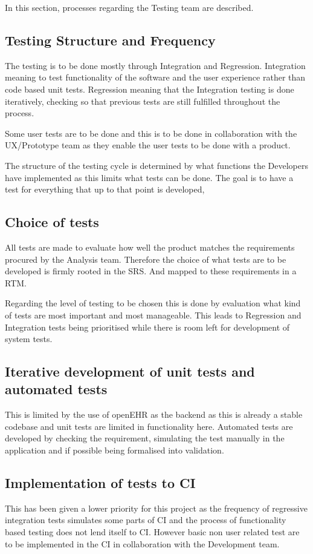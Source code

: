 In this section, processes regarding the Testing team are described.

\subsection{Testing Structure and Frequency}
The testing is to be done mostly through Integration and Regression. Integration meaning to test functionality of the software and the user experience rather than code based unit tests.
Regression meaning that the Integration testing is done iteratively, checking so that previous tests are still fulfilled throughout the process.

Some user tests are to be done and this is to be done in collaboration with the UX/Prototype team as they enable the user tests to be done with a product.

The structure of the testing cycle is determined by what functions the Developers have implemented as this limits what tests can be done. The goal is to have a test for everything that up to that point is developed,

\subsection{Choice of tests}
All tests are made to evaluate how well the product matches the requirements procured by the Analysis team. Therefore the choice of what tests are to be developed is firmly rooted in the SRS. And mapped to these requirements in a RTM.

Regarding the level of testing to be chosen this is done by evaluation what kind of tests are most important and most manageable. This leads to Regression and Integration tests being prioritised while there is room left for development of system tests.

\subsection{Iterative development of unit tests and automated tests}
This is limited by the use of openEHR as the backend as this is already a stable codebase and unit tests are limited in functionality here. Automated tests are developed by checking the requirement, simulating the test manually in the application and if possible being formalised into validation.

\subsection{Implementation of tests to CI}
This has been given a lower priority for this project as the frequency of regressive integration tests simulates some parts of CI and the process of functionality based testing does not lend itself to CI. However basic non user related test are to be implemented in the CI in collaboration with the Development team.

